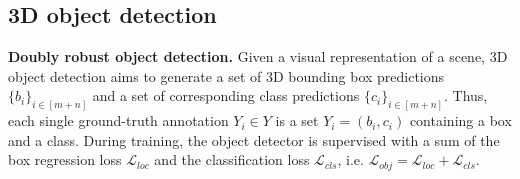 \begin{table}[t]
\footnotesize
\centering
\caption{Comparisons on mini-ImageNet100, all models trained for 100 epochs.}
\setlength{\tabcolsep}{10pt}
\renewcommand\arraystretch{1.05}
    \label{tab:classification_100sample}
    \vspace{-6pt}
\end{table}


%




\subsection{3D object detection}
\textbf{Doubly robust object detection.}
Given a visual representation of a scene, 3D object detection aims to generate a set of 3D bounding box predictions $\{b_i\}_{i\in[m+n]}$ and a set of corresponding class predictions $\{c_i\}_{i\in[m+n]}$. Thus, each single ground-truth annotation $Y_i \in Y$ is a set $Y_i = (b_i, c_i)$ containing a box and a class. During training, the object detector is supervised with a sum of the box regression loss $\mathcal{L}_{loc}$ and the classification loss $\mathcal{L}_{cls}$, i.e. $\mathcal{L}_{obj} = \mathcal{L}_{loc} + \mathcal{L}_{cls}$.

